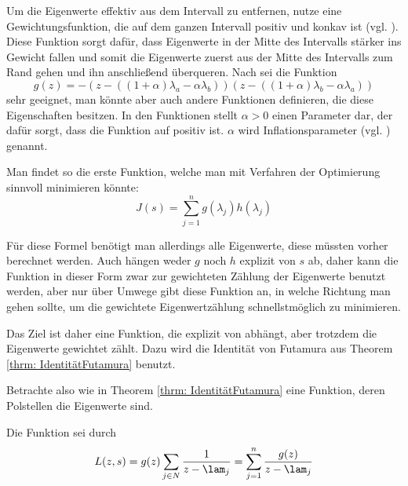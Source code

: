\documentclass[a4paper,12pt]{report}
\newcommand{\1}{\mathds{1}}
\theoremstyle{plain} %
\theoremstyle{definition} %
\theoremstyle{remark}
\begin{document}
            Um die Eigenwerte effektiv aus dem Intervall zu entfernen, nutze eine Gewichtungsfunktion, die auf dem ganzen Intervall positiv und konkav ist (vgl. \cite[S. 3]{hauptteilTkachuk}).
            Diese Funktion sorgt dafür, dass Eigenwerte in der Mitte des Intervalls stärker ins Gewicht fallen und somit die Eigenwerte zuerst aus der Mitte des Intervalls zum Rand gehen und ihn anschließend überqueren.
            Nach \cite[S. 3]{hauptteilTkachuk} sei die Funktion
            $$g(z) = -(z-((1+\alpha)\lambda_a -\alpha\lambda_b))(z-((1+\alpha)\lambda_b-\alpha\lambda_a))$$
            sehr geeignet, man könnte aber auch andere Funktionen definieren, die diese Eigenschaften besitzen.
            In den Funktionen stellt $\alpha>0$ einen Parameter dar, der dafür sorgt, dass die Funktion auf \lamAlamB positiv ist.
            $\alpha$ wird Inflationsparameter (vgl. \cite[S. 3]{hauptteilTkachuk}) genannt.

            Man findet so die erste Funktion, welche man mit Verfahren der Optimierung sinnvoll minimieren könnte:
            \begin{equation}
                  \label{def: J original}
                  J(s) = \sum_{j=1}^n g(\lambda_j)h(\lambda_j)
            \end{equation}

            Für diese Formel benötigt man allerdings alle Eigenwerte, diese müssten vorher berechnet werden.
            Auch hängen weder $g$ noch $h$ explizit von $s$ ab, daher kann die Funktion \J in dieser Form zwar zur gewichteten Zählung der Eigenwerte benutzt werden,
            aber nur über Umwege gibt diese Funktion an, in welche Richtung man gehen sollte, um die gewichtete Eigenwertzählung schnellstmöglich zu minimieren.
            
            Das Ziel ist daher eine Funktion, die explizit von \s abhängt, aber trotzdem die Eigenwerte gewichtet zählt.
            Dazu wird die Identität von Futamura aus Theorem \ref{thrm: IdentitätFutamura} benutzt.

            Betrachte also wie in Theorem \ref{thrm: IdentitätFutamura} eine Funktion, deren Polstellen die Eigenwerte sind.

            Die Funktion sei durch
            \begin{equation}
                  \label{eqn: ZielfunktionMitPolstellen}
                  L(z, s) = g(z)\sum_{j\in N} \frac{1}{z-\lam_j} = \sum_{j=1}^n \frac{g(z)}{z-\lam_j}
            \end{equation}
\end{document}
